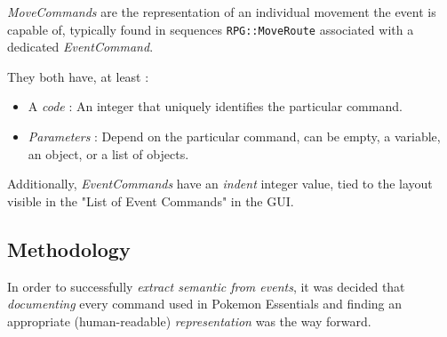 \documentclass[11pt]{article}
\begin{document}
\textit{MoveCommands} are the representation of an individual movement the event is capable of, typically found in sequences \verb|RPG::MoveRoute| associated with a dedicated \textit{EventCommand}.

They both have, at least :
\begin{itemize}
	\item A \textit{code} : An integer that uniquely identifies the particular command.
	\item \textit{Parameters} : Depend on the particular command, can be empty, a variable, an object, or a list of objects.
\end{itemize}

Additionally, \textit{EventCommands} have an \textit{indent} integer value, tied to the layout visible in the "List of Event Commands" in the GUI.


\subsection{Methodology}

In order to successfully \textit{extract semantic from events}, it was decided that \textit{documenting} every command used in Pokemon Essentials and finding an appropriate (human-readable) \textit{representation} was the way forward.



\end{document}
